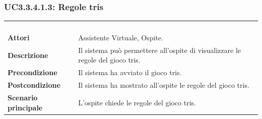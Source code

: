 \subsubsection{UC3.3.4.1.3: Regole tris}
\label{UC3.3.4.1.3}
\begin{longtable}{l|p{10cm}}
\rowcolor[gray]{0.8} \multicolumn{2}{c}{} \\
\rowcolor[gray]{0.8} \multicolumn{2}{c}{\textbf{UC3.3.4.1.3 - Regole tris}} \\
\rowcolor[gray]{0.8} \multicolumn{2}{c}{} \\
\hline
&\\
\textbf{Attori} & Assistente Virtuale, Ospite.\\[7pt]
\textbf{Descrizione} & Il sistema può permettere all'ospite di visualizzare le regole del gioco tris.\\[7pt]
\textbf{Precondizione} & Il sistema ha avviato il gioco tris.\\[7pt]
\textbf{Postcondizione} & Il sistema ha mostrato all'ospite le regole del gioco tris.\\[7pt]
\textbf{Scenario principale} &L'ospite chiede le regole del gioco tris.\\[7pt]\hline
\end{longtable}

